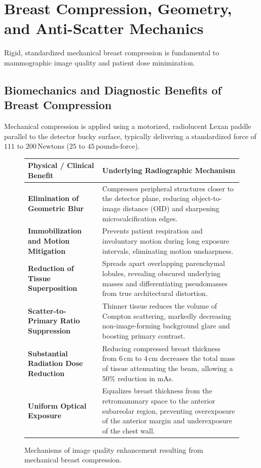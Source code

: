 \documentclass[11pt,a4paper]{article}
\begin{document}
\section{Breast Compression, Geometry, and Anti-Scatter Mechanics}

Rigid, standardized mechanical breast compression is fundamental to mammographic image quality and patient dose minimization.

\subsection{Biomechanics and Diagnostic Benefits of Breast Compression}

Mechanical compression is applied using a motorized, radiolucent Lexan paddle parallel to the detector bucky surface, typically delivering a standardized force of $111\text{ to }200\,\text{Newtons}$ ($25\text{ to }45\,\text{pounds-force}$).

\begin{figure}[htbp]
\centering
\setlength{\tabcolsep}{4pt}
\begin{tabular}{lp{11.5cm}}
\toprule
\textbf{Physical / Clinical Benefit} & \textbf{Underlying Radiographic Mechanism} \\
\midrule
\textbf{Elimination of Geometric Blur} & Compresses peripheral structures closer to the detector plane, reducing object-to-image distance ($\text{OID}$) and sharpening microcalcification edges. \\
\addlinespace
\textbf{Immobilization and Motion Mitigation} & Prevents patient respiration and involuntary motion during long exposure intervals, eliminating motion unsharpness. \\
\addlinespace
\textbf{Reduction of Tissue Superposition} & Spreads apart overlapping parenchymal lobules, revealing obscured underlying masses and differentiating pseudomasses from true architectural distortion. \\
\addlinespace
\textbf{Scatter-to-Primary Ratio Suppression} & Thinner tissue reduces the volume of Compton scattering, markedly decreasing non-image-forming background glare and boosting primary contrast. \\
\addlinespace
\textbf{Substantial Radiation Dose Reduction} & Reducing compressed breast thickness from $6\,\text{cm}$ to $4\,\text{cm}$ decreases the total mass of tissue attenuating the beam, allowing a $50\%$ reduction in mAs. \\
\addlinespace
\textbf{Uniform Optical Exposure} & Equalizes breast thickness from the retromammary space to the anterior subareolar region, preventing overexposure of the anterior margin and underexposure of the chest wall. \\
\bottomrule
\end{tabular}
\caption{Mechanisms of image quality enhancement resulting from mechanical breast compression.}
\label{tab:compression_benefits}
\end{figure}
\end{document}
